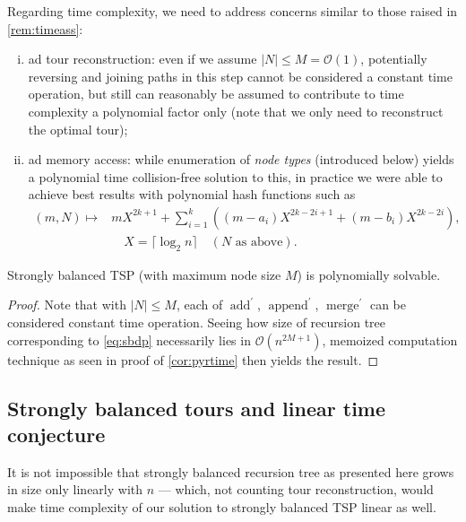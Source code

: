 \documentclass[index=totoc,bibliography=totoc]{scrartcl}
\numberwithin{equation}{section}
\numberwithin{figure}{section}
\numberwithin{table}{section}
\let\defstyle\itshape
\begin{document}
Regarding time complexity, we need to address concerns similar to
those raised in
\cref{rem:timeass}:
\begin{enumerate}[(i)]
  \item
    ad tour reconstruction:
    even if we assume $\left|N\right| \leq M = \mathcal{O}\left(1\right)$,
    potentially reversing and joining paths
    in this step cannot be considered a constant time operation,
    but still can reasonably be assumed to contribute to time complexity
    a polynomial factor only (note that we only need to reconstruct the optimal tour);
  \item
    ad memory access:
    while enumeration of {\defstyle node types} (introduced below) yields
    a polynomial time collision-free solution to this,
    in practice we were able to achieve best results with polynomial hash functions such as
    \begin{align*}
      \left(m,N\right) \mapsto & mX^{2k+1}
        + \sum_{i=1}^k\left((m-a_i)X^{2k-2i+1} + (m-b_i)X^{2k-2i}\right),
      \\
      & \quad X = \lceil\log_2 n\rceil \quad (N \text{\ as above}).
    \end{align*}
\end{enumerate}

\begin{corollary}
\label{cor:sbtime}
  Strongly balanced TSP (with maximum node size $M$) is polynomially solvable.
\end{corollary}
\begin{proof}
  Note that with $\left|N\right| \leq M$, each of
  $\operatorname{add}^\prime$, $\operatorname{append}^\prime$,
  $\operatorname{merge}^\prime$ can be considered constant time
  operation.
  Seeing how size of recursion tree corresponding to \cref{eq:sbdp}
  necessarily lies in $\mathcal{O}\left(n^{2M+1}\right)$,
  memoized computation technique as seen in proof of \cref{cor:pyrtime}
  then yields the result.
\end{proof}

\subsection{Strongly balanced tours and linear time conjecture}

It is not impossible that strongly balanced recursion tree as presented
here grows in size only linearly with $n$ --- which, not counting tour
reconstruction, would make time complexity of our solution to strongly
balanced TSP linear as well.
\end{document}
